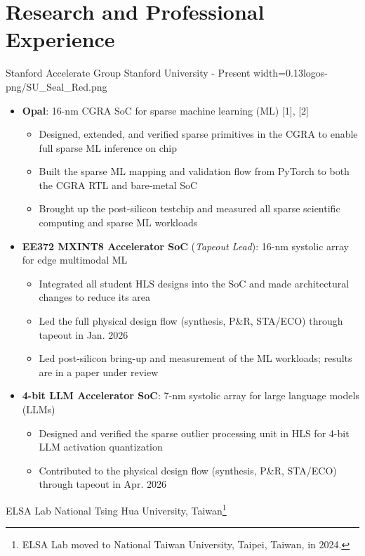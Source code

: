 \documentclass{cvclass}
\newcommand{\simplemmyy}[3]{\shortmmyyformat\formatdate{#3}{#2}{#1}}
\begin{document}
\section{Research and Professional Experience}
    {Stanford Accelerate Group}
    {Stanford University}
    {\simplemmyy{2023}{07}{16} - Present}
    {width=0.13\linewidth}{logos-png/SU_Seal_Red.png}
\begin{itemize}
    \item \textbf{Opal}: 16-nm CGRA SoC for sparse machine learning (ML) [1], [2]
    \begin{itemize}
        \item Designed, extended, and verified sparse primitives in the CGRA to enable full sparse ML inference on chip
        \item Built the sparse ML mapping and validation flow from PyTorch to both the CGRA RTL and bare-metal SoC
        \item Brought up the post-silicon testchip and measured all sparse scientific computing and sparse ML workloads
    \end{itemize}
    \item \textbf{EE372 MXINT8 Accelerator SoC} (\textit{Tapeout Lead}): 16-nm systolic array for edge multimodal ML
    \begin{itemize}
        \item Integrated all student HLS designs into the SoC and made architectural changes to reduce its area
        \item Led the full physical design flow (synthesis, P\&R, STA/ECO) through tapeout in Jan. 2026
        \item Led post-silicon bring-up and measurement of the ML workloads; results are in a paper under review
    \end{itemize}
    \item \textbf{4-bit LLM Accelerator SoC}: 7-nm systolic array for large language models (LLMs)
    \begin{itemize}
        \item Designed and verified the sparse outlier processing unit in HLS for 4-bit LLM activation quantization
        \item Contributed to the physical design flow (synthesis, P\&R, STA/ECO) through tapeout in Apr. 2026
    \end{itemize}
\end{itemize}
    {ELSA Lab}
    {National Tsing Hua University, Taiwan\footnote{ELSA Lab moved to National Taiwan University, Taipei, Taiwan, in 2024.}}
\end{document}
